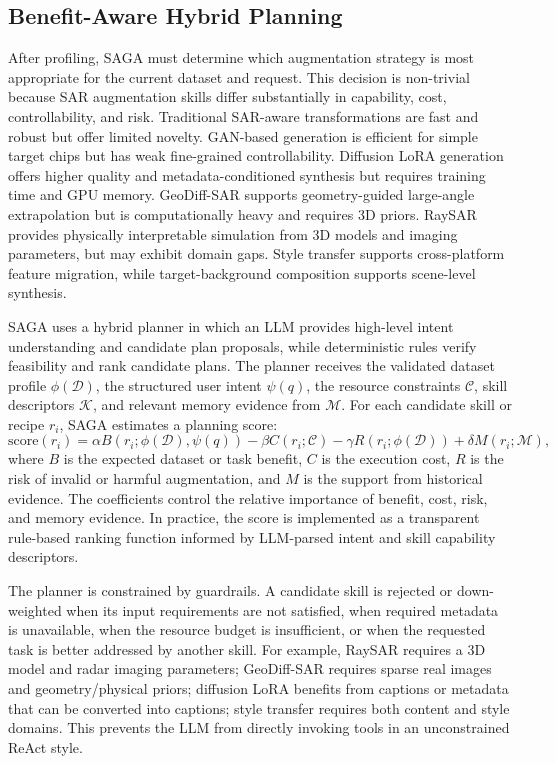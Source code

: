 \subsection{Benefit-Aware Hybrid Planning}
\label{subsec:benefit_planning}

After profiling, SAGA must determine which augmentation strategy is most appropriate for the current dataset and request.
This decision is non-trivial because SAR augmentation skills differ substantially in capability, cost, controllability, and risk.
Traditional SAR-aware transformations are fast and robust but offer limited novelty.
GAN-based generation is efficient for simple target chips but has weak fine-grained controllability.
Diffusion LoRA generation offers higher quality and metadata-conditioned synthesis but requires training time and GPU memory.
GeoDiff-SAR supports geometry-guided large-angle extrapolation but is computationally heavy and requires 3D priors.
RaySAR provides physically interpretable simulation from 3D models and imaging parameters, but may exhibit domain gaps.
Style transfer supports cross-platform feature migration, while target-background composition supports scene-level synthesis.

SAGA uses a hybrid planner in which an LLM provides high-level intent understanding and candidate plan proposals, while deterministic rules verify feasibility and rank candidate plans.
The planner receives the validated dataset profile $\phi(\mathcal{D})$, the structured user intent $\psi(q)$, the resource constraints $\mathcal{C}$, skill descriptors $\mathcal{K}$, and relevant memory evidence from $\mathcal{M}$.
For each candidate skill or recipe $r_i$, SAGA estimates a planning score:
\begin{equation}
\mathrm{score}(r_i)
=
\alpha B(r_i;\phi(\mathcal{D}),\psi(q))
- \beta C(r_i;\mathcal{C})
- \gamma R(r_i;\phi(\mathcal{D}))
+ \delta M(r_i;\mathcal{M}),
\label{eq:planning_score}
\end{equation}
where $B$ is the expected dataset or task benefit, $C$ is the execution cost, $R$ is the risk of invalid or harmful augmentation, and $M$ is the support from historical evidence.
The coefficients control the relative importance of benefit, cost, risk, and memory evidence.
In practice, the score is implemented as a transparent rule-based ranking function informed by LLM-parsed intent and skill capability descriptors.

The planner is constrained by guardrails.
A candidate skill is rejected or down-weighted when its input requirements are not satisfied, when required metadata is unavailable, when the resource budget is insufficient, or when the requested task is better addressed by another skill.
For example, RaySAR requires a 3D model and radar imaging parameters; GeoDiff-SAR requires sparse real images and geometry/physical priors; diffusion LoRA benefits from captions or metadata that can be converted into captions; style transfer requires both content and style domains.
This prevents the LLM from directly invoking tools in an unconstrained ReAct style.

